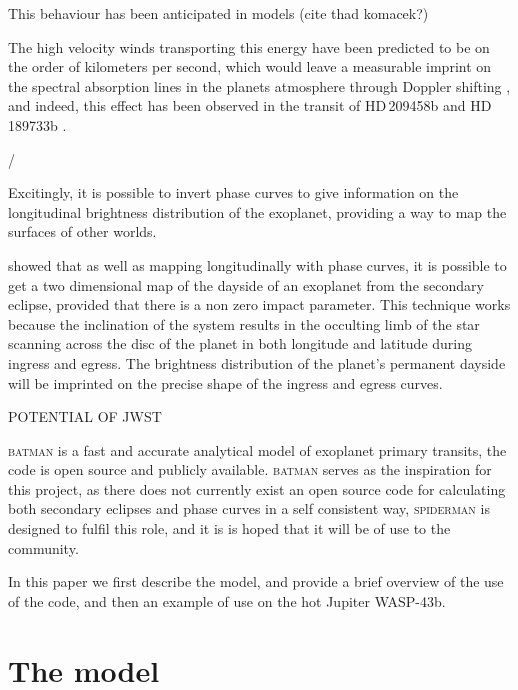\documentclass[a4paper,fleqn,usenatbib]{mnras}
\begin{document}
This behaviour has been anticipated in models (cite thad komacek?)

The high velocity winds transporting this energy have been predicted to be on the order of kilometers per second, which would leave a measurable imprint on the spectral absorption lines in the planets atmosphere through Doppler shifting \citep[e.g.][]{Showman2013}, and indeed, this effect has been observed in the transit of HD\,209458b \citep{Snellen2010} and HD\,189733b \citep{Louden2015}. 

/%

Excitingly, it is possible to invert phase curves to give information on the longitudinal brightness distribution of the exoplanet, providing a way to map the surfaces of other worlds. 

\cite{Majeau2012} showed that as well as mapping longitudinally with phase curves, it is possible to get a two dimensional map of the dayside of an exoplanet from the secondary eclipse, provided that there is a non zero impact parameter. This technique works because the inclination of the system results in the occulting limb of the star scanning across the disc of the planet in both longitude and latitude during ingress and egress. The brightness distribution of the planet's permanent dayside will be imprinted on the precise shape of the ingress and egress curves.

POTENTIAL OF JWST

\textsc{batman} \citep{Kreidberg2015a} is a fast and accurate analytical model of exoplanet primary transits, the code is open source and publicly available. \textsc{batman} serves as the inspiration for this project, as there does not currently exist an open source code for calculating both secondary eclipses and phase curves in a self consistent way, \textsc{spiderman} is designed to fulfil this role, and it is is hoped that it will be of use to the community.

In this paper we first describe the model, and provide a brief overview of the use of the code, and then an example of use on the hot Jupiter WASP-43b.

\section{The model}\label{sec:the model}
\end{document}
